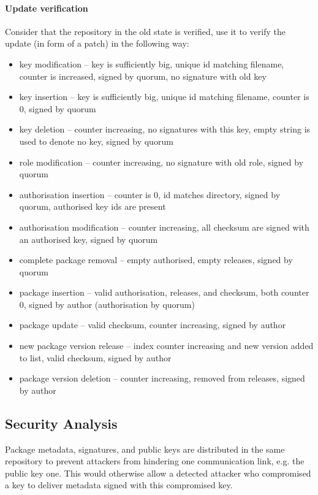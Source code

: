 \documentclass[nocopyrightspace]{sigplanconf}
\newcommand{\TODO}[1]{\textbf{[TODO: #1]}}
\begin{document}
\paragraph{Update verification}  Consider that the repository in the old state is verified, use it to verify the update (in form of a patch) in the following way:
\begin{itemize}
  \item key modification -- key is sufficiently big, unique id matching filename, counter is increased, signed by quorum, no signature with old key
  \item key insertion -- key is sufficiently big, unique id matching filename, counter is 0, signed by quorum
  \item key deletion -- counter increasing, no signatures with this key, empty string is used to denote no key, signed by quorum
  \item role modification -- counter increasing, no signature with old role, signed by quorum
  \item authorisation insertion -- counter is 0, id matches directory, signed by quorum, authorised key ids are present
  \item authorisation modification -- counter increasing, all checksum are signed with an authorised key, signed by quorum
  \item complete package removal -- empty authorised, empty releases, signed by quorum
  \item package insertion -- valid authorisation, releases, and checksum, both counter 0, signed by author (authorisation by quorum)
  \item package update -- valid checksum, counter increasing, signed by author
  \item new package version release -- index counter increasing and new version added to list, valid checksum, signed by author
  \item package version deletion -- counter increasing, removed from releases, signed by author
\end{itemize}

\subsection{Security Analysis}

Package metadata, signatures, and public keys are distributed in the same repository to prevent attackers from hindering one communication link, e.g. the public key one.
This would otherwise allow a detected attacker who compromised a key to deliver metadata signed with this compromised key.
\end{document}
